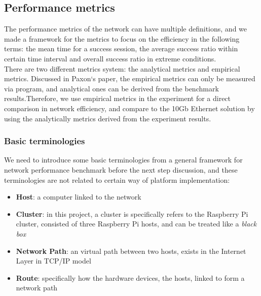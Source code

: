 \documentclass[11pt,openright,a4paper]{report}
\begin{document}
\subsection{Performance metrics}
The performance metrics of the network can have multiple definitions, and we made a framework for the metrics to focus on the efficiency in the following terms: the mean time for a success session, the average success ratio within certain time interval and overall success ratio in extreme conditions\cite{cerf1991guidelines}.\\
There are two different metrics system: the analytical metrics and empirical metrics\cite{paxson1996towards}. Discussed in Paxon`s paper, the empirical metrics can only be measured via program, and analytical ones can be derived from the benchmark results.Therefore, we use empirical metrics in the experiment for a direct comparison in network efficiency, and compare to the 10Gb Ethernet solution by using the analytically metrics derived from the experiment results.\\
\subsubsection{Basic terminologies}
We need to introduce some basic terminologies from a general framework for network performance benchmark before the next step discussion, and these terminologies are not related to certain way of platform implementation\cite{paxson1996towards}:
\begin{itemize}
	\item \textbf{Host}: a computer linked to the network
	\item \textbf{Cluster}: in this project, a cluster is specifically refers to the Raspberry Pi cluster, consisted of three Raspberry Pi hosts, and can be treated like a \textit{black box}
	\item \textbf{Network Path}: an virtual path between two hosts, exists in the Internet Layer  in TCP/IP model
	\item \textbf{Route}: specifically how the hardware devices, the hosts, linked to form a network path
\end{itemize}
\end{document}
